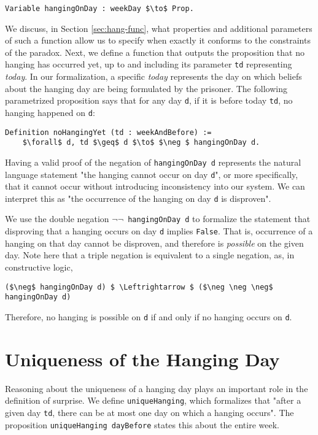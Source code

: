 \documentclass[runningheads]{llncs}
\begin{document}
\begin{lstlisting}[mathescape=true]
  Variable hangingOnDay : weekDay $\to$ Prop.
\end{lstlisting}

We discuss, in Section \ref{sec:hang-func}, what properties and additional parameters of
such a function allow us to specify when exactly it conforms to the constraints of the paradox.
Next, we define a function that outputs the proposition that no hanging has occurred
yet, up to and including its parameter {\tt td} representing \emph{today}.
In our formalization, a specific \emph{today} represents the day on which beliefs about
the hanging day are being formulated by the prisoner.
The following parametrized proposition says that for any day {\tt d}, if it is before today {\tt td}, no hanging
happened on {\tt d}:

\begin{lstlisting}[mathescape=true]
  Definition noHangingYet (td : weekAndBefore) :=
    $\forall$ d, td $\geq$ d $\to$ $\neg $ hangingOnDay d.
\end{lstlisting}

Having a valid proof of the negation of {\tt hangingOnDay d} represents the natural language
statement "the hanging cannot occur on day {\tt d}", or more specifically, that it
cannot occur without introducing inconsistency into our system. We can interpret
this as "the occurrence of the hanging on day {\tt d} is disproven".

We use the double negation {\tt $\neg \neg$ hangingOnDay d} to formalize the statement
that disproving that a hanging occurs on day {\tt d} implies {\tt False}. That is,
occurrence of a hanging on that day cannot be disproven, and therefore is
\emph{possible} on the given day. Note here that a triple negation is
equivalent to a single negation, as, in constructive logic,

\begin{lstlisting}[mathescape=true]
  ($\neg$ hangingOnDay d) $ \Leftrightarrow $ ($\neg \neg \neg$ hangingOnDay d)
\end{lstlisting}

Therefore, no hanging is possible on {\tt d} if and only if no hanging occurs on
{\tt d}.

\section{Uniqueness of the Hanging Day }
\label{sec:unique}

Reasoning about the uniqueness of a hanging day plays an important role in the
definition of surprise.
We define {\tt uniqueHanging}, which formalizes that "after a given day {\tt td},
there can be at most one day on which a hanging occurs". The proposition
{\tt uniqueHanging dayBefore} states this about the entire week.
\end{document}
